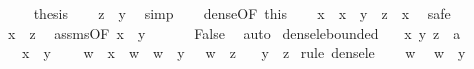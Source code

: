 \begin{isabellebody}
\ \ \isamarkupfalse%
\ {\isachardoublequoteopen}{\isasymnot}\ {\isacharquery}{\kern0pt}thesis{\isachardoublequoteclose}\isanewline
\ \ \isamarkupfalse%
\ {\isachardoublequoteopen}z\ {\isacharless}{\kern0pt}\ y{\isachardoublequoteclose}\ \isamarkupfalse%
\ simp\isanewline
\ \ \isamarkupfalse%
\ dense{\isacharbrackleft}{\kern0pt}OF\ this{\isacharbrackright}{\kern0pt}\isanewline
\ \ \isamarkupfalse%
\ x\ \ {\isachardoublequoteopen}x\ {\isacharless}{\kern0pt}\ y{\isachardoublequoteclose}\ \ {\isachardoublequoteopen}z\ {\isacharless}{\kern0pt}\ x{\isachardoublequoteclose}\ \isamarkupfalse%
\ safe\isanewline
\ \ \isamarkupfalse%
\ \isamarkupfalse%
\ {\isachardoublequoteopen}x\ {\isasymle}\ z{\isachardoublequoteclose}\ \isamarkupfalse%
\ assms{\isacharbrackleft}{\kern0pt}OF\ {\isacartoucheopen}x\ {\isacharless}{\kern0pt}\ y{\isacartoucheclose}{\isacharbrackright}{\kern0pt}\ \isacommand{{\isachardot}{\kern0pt}}\isamarkupfalse%
\isanewline
\ \ \isamarkupfalse%
\ \isamarkupfalse%
\ False\ \isamarkupfalse%
\ auto\isanewline
{}\isamarkupfalse%
%
\endisatagproof
{\isafoldproof}%
%
\isadelimproof
\isanewline
%
\endisadelimproof
\isanewline
{}\isamarkupfalse%
\ dense{\isacharunderscore}{\kern0pt}le{\isacharunderscore}{\kern0pt}bounded{\isacharcolon}{\kern0pt}\isanewline
\ \ \ x\ y\ z\ {\isacharcolon}{\kern0pt}{\isacharcolon}{\kern0pt}\ {\isacharprime}{\kern0pt}a\isanewline
\ \ \ {\isachardoublequoteopen}x\ {\isacharless}{\kern0pt}\ y{\isachardoublequoteclose}\isanewline
\ \ \ {\isacharasterisk}{\kern0pt}{\isacharcolon}{\kern0pt}\ {\isachardoublequoteopen}{\isasymAnd}w{\isachardot}{\kern0pt}\ {\isasymlbrakk}\ x\ {\isacharless}{\kern0pt}\ w\ {\isacharsemicolon}{\kern0pt}\ w\ {\isacharless}{\kern0pt}\ y\ {\isasymrbrakk}\ {\isasymLongrightarrow}\ w\ {\isasymle}\ z{\isachardoublequoteclose}\isanewline
\ \ \ {\isachardoublequoteopen}y\ {\isasymle}\ z{\isachardoublequoteclose}\isanewline
%
\isadelimproof
%
\endisadelimproof
%
\isatagproof
{}\isamarkupfalse%
\ {\isacharparenleft}{\kern0pt}rule\ dense{\isacharunderscore}{\kern0pt}le{\isacharparenright}{\kern0pt}\isanewline
\ \ \isamarkupfalse%
\ w\ \isamarkupfalse%
\ {\isachardoublequoteopen}w\ {\isacharless}{\kern0pt}\ y{\isachardoublequoteclose}\isanewline

\end{isabellebody}
